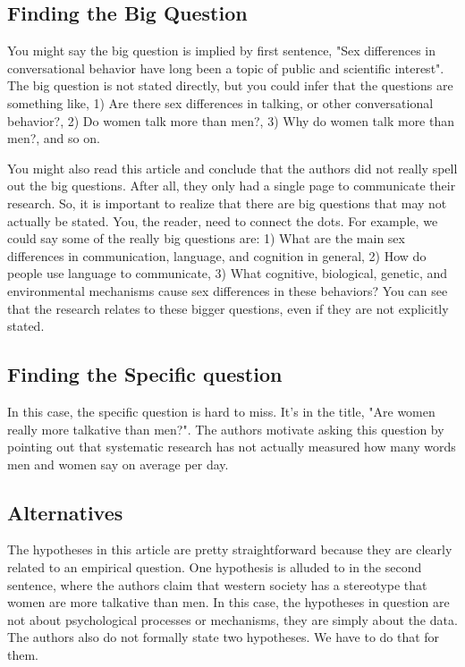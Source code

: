 \subsection{Finding the Big Question}

You might say the big question is implied by first sentence, "Sex differences in conversational behavior have long been a topic of public and scientific interest". The big question is not stated directly, but you could infer that the questions are something like, 1) Are there sex differences in talking, or other conversational behavior?, 2) Do women talk more than men?, 3) Why do women talk more than men?, and so on. 

You might also read this article and conclude that the authors did not really spell out the big questions. After all, they only had a single page to communicate their research. So, it is important to realize that there are big questions that may not actually be stated. You, the reader, need to connect the dots. For example, we could say some of the really big questions are: 1) What are the main sex differences in communication, language, and cognition in general, 2) How do people use language to communicate, 3) What cognitive, biological, genetic, and environmental mechanisms cause sex differences in these behaviors? You can see that the research relates to these bigger questions, even if they are not explicitly stated.

\subsection{Finding the Specific question}

In this case, the specific question is hard to miss. It's in the title, "Are women really more talkative than men?". The authors motivate asking this question by pointing out that systematic research has not actually measured how many words men and women say on average per day.

\subsection{Alternatives}

The hypotheses in this article are pretty straightforward because they are clearly related to an empirical question. One hypothesis is alluded to in the second sentence, where the authors claim that western society has a stereotype that women are more talkative than men. In this case, the hypotheses in question are not about psychological processes or mechanisms, they are simply about the data. The authors also do not formally state two hypotheses. We have to do that for them.

